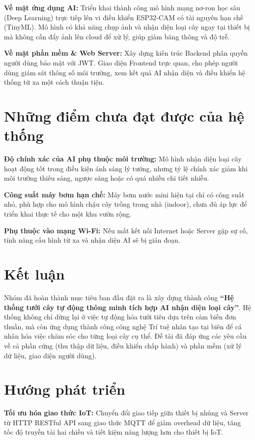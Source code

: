 \documentclass[12pt,a4paper]{report}
\begin{document}
\textbf{Về mặt ứng dụng AI:} Triển khai thành công mô hình mạng nơ-ron học sâu
(Deep Learning) trực tiếp lên vi điều khiển ESP32-CAM có tài nguyên hạn chế
(TinyML). Mô hình có khả năng chụp ảnh và nhận diện loại cây ngay tại thiết bị
mà không cần đẩy ảnh lên cloud để xử lý, giúp giảm băng thông và độ trễ.

\textbf{Về mặt phần mềm \& Web Server:} Xây dựng kiến trúc Backend phân quyền
người dùng bảo mật với JWT. Giao diện Frontend trực quan, cho phép người dùng
giám sát thông số môi trường, xem kết quả AI nhận diện và điều khiển hệ thống
từ xa một cách thuận tiện.

\section{Những điểm chưa đạt được của hệ thống}

\textbf{Độ chính xác của AI phụ thuộc môi trường:} Mô hình nhận diện loại cây
hoạt động tốt trong điều kiện ánh sáng lý tưởng, nhưng tỷ lệ chính xác giảm
khi môi trường thiếu sáng, ngược sáng hoặc có quá nhiều chi tiết nhiễu.

\textbf{Công suất máy bơm hạn chế:} Máy bơm nước mini hiện tại chỉ có công suất
nhỏ, phù hợp cho mô hình chậu cây trồng trong nhà (indoor), chưa đủ áp lực
để triển khai thực tế cho một khu vườn rộng.

\textbf{Phụ thuộc vào mạng Wi-Fi:} Nếu mất kết nối Internet hoặc Server gặp sự
cố, tính năng cấu hình từ xa và nhận diện AI sẽ bị gián đoạn.

\section{Kết luận}

Nhóm đã hoàn thành mục tiêu ban đầu đặt ra là xây dựng thành công
\textbf{``Hệ thống tưới cây tự động thông minh tích hợp AI nhận diện loại
cây''}. Hệ thống không chỉ dừng lại ở việc tự động hóa tưới tiêu dựa trên cảm
biến đơn thuần, mà còn ứng dụng thành công công nghệ Trí tuệ nhân tạo tại biên
để cá nhân hóa việc chăm sóc cho từng loại cây cụ thể. Đề tài đã đáp ứng các
yêu cầu về cả phần cứng (thu thập dữ liệu, điều khiển chấp hành) và phần mềm
(xử lý dữ liệu, giao diện người dùng).

\section{Hướng phát triển}

\textbf{Tối ưu hóa giao thức IoT:} Chuyển đổi giao tiếp giữa thiết bị nhúng và
Server từ HTTP RESTful API sang giao thức MQTT để giảm overhead dữ liệu, tăng
tốc độ truyền tải hai chiều và tiết kiệm năng lượng hơn cho thiết bị IoT.
\end{document}

